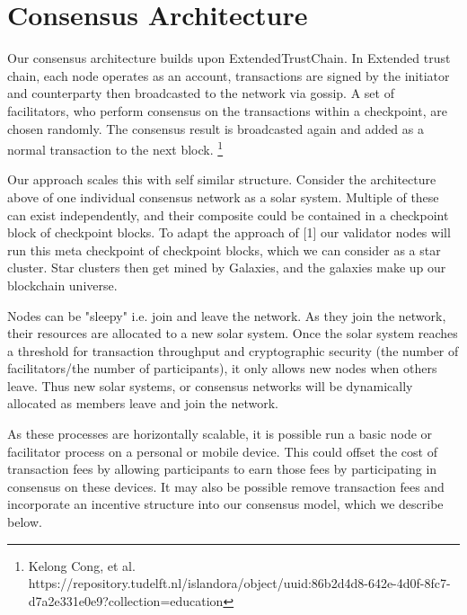 \documentclass{article}
\begin{document}
\section{Consensus Architecture}
Our consensus architecture builds upon ExtendedTrustChain. In Extended trust chain, each node operates as an account, transactions are signed by the initiator and counterparty then broadcasted to the network via gossip. A set of facilitators, who perform consensus on the transactions within a checkpoint, are chosen randomly. The consensus result is broadcasted again and added as a normal transaction to the next block. \footnote{Kelong Cong, et al. https://repository.tudelft.nl/islandora/object/uuid:86b2d4d8-642e-4d0f-8fc7-d7a2e331e0e9?collection=education} 

Our approach scales this with self similar structure. Consider the architecture above of one individual consensus network as a solar system. Multiple of these can exist independently, and their composite could be contained in a checkpoint block of checkpoint blocks. To adapt the approach of [1] our validator nodes will run this meta checkpoint of checkpoint blocks, which we can consider as a star cluster. Star clusters then get mined by Galaxies, and the galaxies make up our blockchain universe.

Nodes can be "sleepy" i.e. join and leave the network. As they join the network, their resources are allocated to a new solar system. Once the solar system reaches a threshold for transaction throughput and cryptographic security (the number of facilitators/the number of participants), it only allows new nodes when others leave. Thus new solar systems, or consensus networks will be dynamically allocated as members leave and join the network.

As these processes are horizontally scalable, it is possible run a basic node or facilitator process on a personal or mobile device. This could offset the cost of transaction fees by allowing participants to earn those fees by participating in consensus on these devices. It may also be possible remove transaction fees and incorporate an incentive structure into our consensus model, which we describe below.
\end{document}
